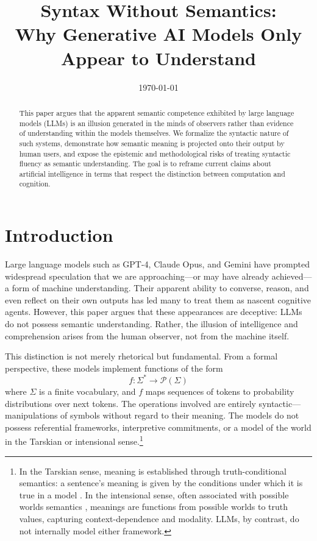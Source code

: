 \documentclass[12pt]{article}
\title{Syntax Without Semantics:\\
Why Generative AI Models Only Appear to Understand}
\author{}
\date{\today}
\theoremstyle{plain}
\theoremstyle{definition}
\theoremstyle{remark}
\begin{document}
\setlength{\parskip}{0.75em}

\maketitle

\begin{abstract}
This paper argues that the apparent semantic competence exhibited by large language models (LLMs) is an illusion generated in the minds of observers rather than evidence of understanding within the models themselves. We formalize the syntactic nature of such systems, demonstrate how semantic meaning is projected onto their output by human users, and expose the epistemic and methodological risks of treating syntactic fluency as semantic understanding. The goal is to reframe current claims about artificial intelligence in terms that respect the distinction between computation and cognition.
\end{abstract}

\section{Introduction}

Large language models such as GPT-4, Claude Opus, and Gemini have prompted widespread speculation that we are approaching—or may have already achieved—a form of machine understanding. Their apparent ability to converse, reason, and even reflect on their own outputs has led many to treat them as nascent cognitive agents. However, this paper argues that these appearances are deceptive: LLMs do not possess semantic understanding. Rather, the illusion of intelligence and comprehension arises from the human observer, not from the machine itself.

This distinction is not merely rhetorical but fundamental. From a formal perspective, these models implement functions of the form
\[
f: \Sigma^* \to \mathcal{P}(\Sigma)
\]
where \( \Sigma \) is a finite vocabulary, and \( f \) maps sequences of tokens to probability distributions over next tokens. The operations involved are entirely syntactic—manipulations of symbols without regard to their meaning. The models do not possess referential frameworks, interpretive commitments, or a model of the world in the Tarskian or intensional sense.\footnote{In the Tarskian sense, meaning is established through truth-conditional semantics: a sentence's meaning is given by the conditions under which it is true in a model \parencite{tarski1943truth}. In the intensional sense, often associated with possible worlds semantics \parencite{carnap1947meaning, montague1974formal}, meanings are functions from possible worlds to truth values, capturing context-dependence and modality. LLMs, by contrast, do not internally model either framework.}
\end{document}
